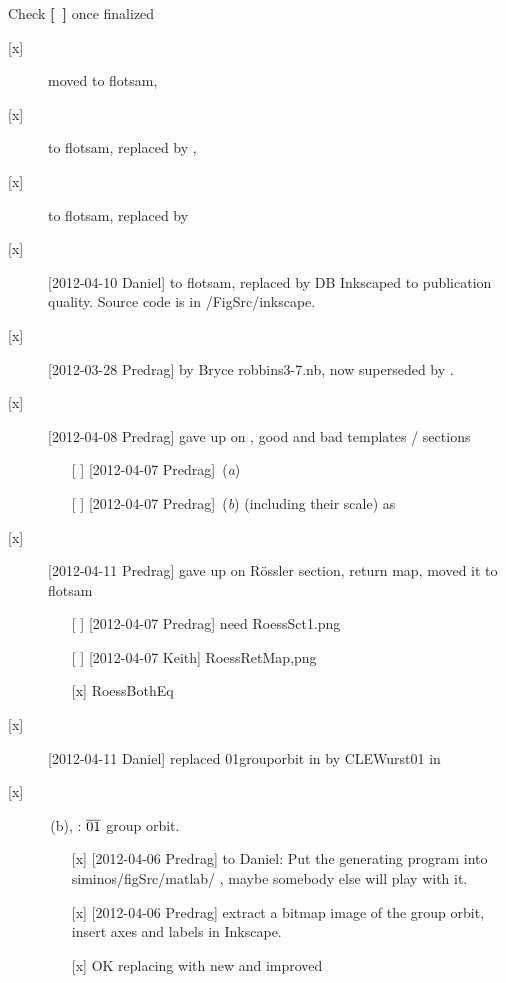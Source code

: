 Check {\bf [~]} once finalized
\begin{description}

\item[{[x]}] moved  to flotsam,
\item[{[x]}]  to flotsam, replaced by ,
\item[{[x]}]  to flotsam, replaced by 
\item[{[x]}] [2012-04-10 Daniel]   to flotsam, replaced by
             DB Inkscaped  to
             publication quality. Source code is in /FigSrc/inkscape.

\item[{[x]}] [2012-03-28 Predrag]
         by Bryce robbins3-7.nb, now superseded by
        .

\item[{[x]}] [2012-04-08 Predrag] gave up on ,
    good and bad templates / sections
    \begin{itemize}
        \item[{[ ]}] [2012-04-07 Predrag] \,({\it a})
        \item[{[ ]}] [2012-04-07 Predrag] \,({\it b})
            (including their scale) as
    \end{itemize}

\item[{[x]}] [2012-04-11 Predrag]  gave up on 
    R\"ossler section, return map, moved it to flotsam
    \begin{itemize}
        \item[{[ ]}] [2012-04-07 Predrag] need {RoessSct1}.png
        \item[{[ ]}] [2012-04-07 Keith] {RoessRetMap},png
        \item[{[x]}]  RoessBothEq
    \end{itemize}

\item[{[x]}] [2012-04-11 Daniel]  replaced {01grouporbit} in
    by CLEWurst01 in 

\item[{[x]}] \,(b), \CLf: $\overline{01}$ {\rpo} group orbit.
    \begin{itemize}
        \item[{[x]}]  [2012-04-06 Predrag] to Daniel:
            Put the generating program into siminos/figSrc/matlab/ , maybe
            somebody else will play with it.
        \item[{[x]}]  [2012-04-06 Predrag] extract a bitmap image of the
            group orbit, insert axes and labels in Inkscape.
        \item[{[x]}] OK replacing  with new and
            improved 
		\end{itemize}

\end{description}
\newpage

